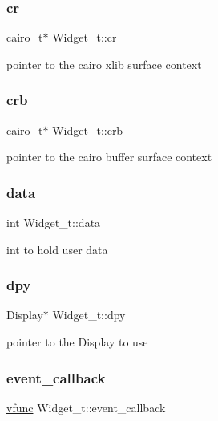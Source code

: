 \subsubsection{\texorpdfstring{cr}{cr}}
{\footnotesize\ttfamily cairo\+\_\+t$\ast$ Widget\+\_\+t\+::cr}

pointer to the cairo xlib surface context \mbox{\label{structWidget__t_ad98022ee160d4c0906110868fc9e5664}} 
\subsubsection{\texorpdfstring{crb}{crb}}
{\footnotesize\ttfamily cairo\+\_\+t$\ast$ Widget\+\_\+t\+::crb}

pointer to the cairo buffer surface context \mbox{\label{structWidget__t_a9dd7b58be77bf31ab021aa627a73186a}} 
\subsubsection{\texorpdfstring{data}{data}}
{\footnotesize\ttfamily int Widget\+\_\+t\+::data}

int to hold user data \mbox{\label{structWidget__t_a5ae8f0fdd24c6baf15173dc0cc9ae360}} 
\subsubsection{\texorpdfstring{dpy}{dpy}}
{\footnotesize\ttfamily Display$\ast$ Widget\+\_\+t\+::dpy}

pointer to the Display to use \mbox{\label{structWidget__t_af0adf855c1991d11f59c5b6f9a2c526a}} 
\subsubsection{\texorpdfstring{event\+\_\+callback}{event\_callback}}
{\footnotesize\ttfamily \hyperlink{xwidget_8h_a6423c133fb634585762a77dda34befab}{vfunc} Widget\+\_\+t\+::event\+\_\+callback}

